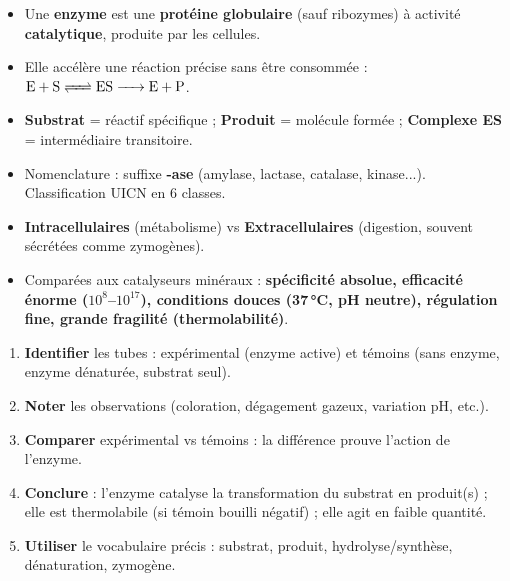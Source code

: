 \documentclass[11pt]{article}
\newcounter{popsec}
\newcounter{popsub}
\newcommand{\courssub}[1]{%
  \stepcounter{popsub}%
  \par\vspace{9pt}\noindent{\popxbold\fontsize{11.5}{13}\selectfont\color{popink}{\color{poporange}\thepopsec.\thepopsub}\hspace{6pt}#1}\par\nopagebreak\vspace{4pt}
}
\begin{document}
\courssub{Synthèse de la section}

\begin{aretenir}
\begin{itemize}
\item Une \textbf{enzyme} est une \textbf{protéine globulaire} (sauf ribozymes) à activité \textbf{catalytique}, produite par les cellules.
\item Elle accélère une réaction précise sans être consommée : $\ce{E + S <=> ES -> E + P}$.
\item \textbf{Substrat} = réactif spécifique ; \textbf{Produit} = molécule formée ; \textbf{Complexe ES} = intermédiaire transitoire.
\item Nomenclature : suffixe \textbf{-ase} (amylase, lactase, catalase, kinase...). Classification UICN en 6 classes.
\item \textbf{Intracellulaires} (métabolisme) vs \textbf{Extracellulaires} (digestion, souvent sécrétées comme zymogènes).
\item Comparées aux catalyseurs minéraux : \textbf{spécificité absolue, efficacité énorme ($10^8$--$10^{17}$), conditions douces (37\,°C, pH neutre), régulation fine, grande fragilité (thermolabilité)}.
\end{itemize}
\end{aretenir}

\begin{methode}
\begin{enumerate}
\item \textbf{Identifier} les tubes : expérimental (enzyme active) et témoins (sans enzyme, enzyme dénaturée, substrat seul).
\item \textbf{Noter} les observations (coloration, dégagement gazeux, variation pH, etc.).
\item \textbf{Comparer} expérimental vs témoins : la différence prouve l'action de l'enzyme.
\item \textbf{Conclure} : l'enzyme catalyse la transformation du substrat en produit(s) ; elle est thermolabile (si témoin bouilli négatif) ; elle agit en faible quantité.
\item \textbf{Utiliser} le vocabulaire précis : substrat, produit, hydrolyse/synthèse, dénaturation, zymogène.
\end{enumerate}
\end{methode}
\end{document}
